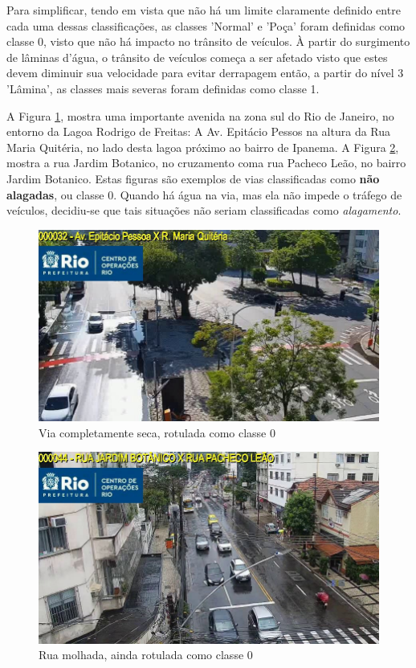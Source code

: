 Para simplificar, tendo em vista que não há um limite claramente definido entre cada uma dessas classificações, as classes 'Normal' e 'Poça' foram definidas como classe 0, 
visto que não há impacto no trânsito de veículos. À partir do surgimento de lâminas d'água, 
o trânsito de veículos começa a ser afetado visto que estes devem diminuir sua velocidade para evitar derrapagem \cite{michelinaquaplaning} então, a partir do nível 3 'Lâmina', 
as classes mais severas foram definidas como classe 1.

A Figura \ref{fig:class0_1}, mostra uma importante avenida na zona sul do Rio de Janeiro, no entorno da Lagoa Rodrigo de Freitas: 
A Av. Epitácio Pessos na altura da Rua Maria Quitéria, no lado desta lagoa próximo ao bairro de Ipanema. 
A Figura \ref{fig:class0_2}, mostra a rua Jardim Botanico, no cruzamento coma rua Pacheco Leão, no bairro Jardim Botanico.
Estas figuras são exemplos de vias classificadas como \textbf{não alagadas}, ou classe 0. 
Quando há água na via, mas ela não impede o tráfego de veículos, decidiu-se que tais situações não seriam classificadas como \textit{alagamento}.

\begin{figure}[htb]
\centerline{\includegraphics[width=0.8\linewidth]{images/0/CODE32 2023-02-22 08-15-04-6.jpg}}
\caption{Via completamente seca, rotulada como classe 0}
\label{fig:class0_1}
\end{figure}

\begin{figure}[htb]
\centerline{\includegraphics[width=0.8\linewidth]{images/0/CODE44 2023-08-20 13-30-31-6.jpg}}
\caption{Rua molhada, ainda rotulada como classe 0}
\label{fig:class0_2}
\end{figure}

